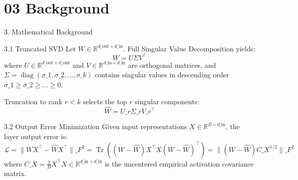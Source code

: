 \section{03 Background}

 3. Mathematical Background

 3.1 Truncated SVD
Let $W \in \mathbb{R}^{d\_{\text{out}} \times d\_{\text{in}}}$. Full Singular Value Decomposition yields:
$$W = U \Sigma V^\top$$
where $U \in \mathbb{R}^{d\_{\text{out}} \times d\_{\text{out}}}$ and $V \in \mathbb{R}^{d\_{\text{in}} \times d\_{\text{in}}}$ are orthogonal matrices, and $\Sigma = \operatorname{diag}(\sigma\_1, \sigma\_2, \dots, \sigma\_k)$ contains singular values in descending order $\sigma\_1 \ge \sigma\_2 \ge \dots \ge 0$.

Truncation to rank $r < k$ selects the top $r$ singular components:
$$\hat{W} = U\_r \Sigma\_r V\_r^\top$$

 3.2 Output Error Minimization
Given input representations $X \in \mathbb{R}^{B \times d\_{\text{in}}}$, the layer output error is:
$$\mathcal{L} = \| W X^\top - \hat{W} X^\top \|\_F^2 = \operatorname{Tr}\left( (W - \hat{W}) X^\top X (W - \hat{W})^\top \right) = \| (W - \hat{W}) C\_X^{1/2} \|\_F^2$$
where $C\_X = \frac{1}{B} X^\top X \in \mathbb{R}^{d\_{\text{in}} \times d\_{\text{in}}}$ is the uncentered empirical activation covariance matrix.
